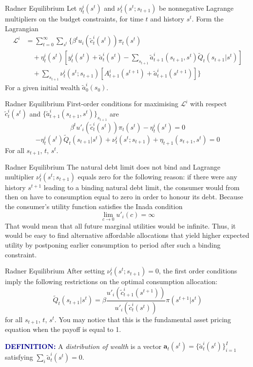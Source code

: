 \documentclass[aspectratio=169,xcolor=dvipsnames]{beamer}
\begin{document}
\begin{frame}{Radner Equilibrium}
    Let $\eta^i_t(s^t)$ and $\nu^i_t(s^t; s_{t+1})$ be nonnegative Lagrange multipliers on the budget constraints, for time $t$ and history $s^t$. Form the Lagrangian
    \begin{align*}
        \mathcal{L}^i &= \sum_{t=0}^\infty \sum_{s^t} \Bigg\{ \beta^t u_i(\tilde c^i_t(s^t)) \pi_t(s^t) \\
        &\quad + \eta^i_t(s^t)\left[ y^i_t(s^t) + \tilde a^i_t(s^t) - \sum_{s_{t+1}} \tilde a^i_{t+1}(s_{t+1}, s^t) \tilde Q_t(s_{t+1} | s^t)\right] \\
        &\quad + \sum_{s_{t+1}} \nu^i_t(s^t; s_{t+1})[A^i_{t+1}(s^{t+1}) + \tilde a^i_{t+1}(s^{t+1})]\Bigg\}
    \end{align*}
    For a given initial wealth $\tilde a^i_0(s_0)$.
\end{frame}

\begin{frame}{Radner Equilibrium}
    First-order conditions for maximising $\mathcal{L}^i$ with respect $\tilde c^i_t(s^t)$ and $\{\tilde a^i_{t+1}(s_{t+1}, s^t)\}_{s_{t+1}}$ are
    \[
        \beta^t u'_i(\tilde c^i_t(s^t)) \pi_t(s^t) - \eta^i_t(s^t) = 0
    \]
    \[
        -\eta^i_t(s^t) \tilde Q_t(s_{t+1} | s^t) + \nu^i_t(s^t; s_{t+1}) + \eta_{t+1}(s_{t+1}, s^t) = 0
    \]
    For all $s_{t+1}$, $t$, $s^t$.
\end{frame}

\begin{frame}{Radner Equilibrium}
    The natural debt limit does not bind and Lagrange multiplier $\nu^i_t(s^t; s_{t+1})$ equals zero for the following reason: if there were any history $s^{t+1}$ leading to a binding natural debt limit, the consumer would from then on have to consumption equal to zero in order to honour its debt. Because the consumer's utility function satisfies the Inada condition
    \[
        \lim_{c \to 0} u'_i(c) = \infty
    \]
    That would mean that all future marginal utilities would be infinite. Thus, it would be easy to find alternative affordable allocations that yield higher expected utility by postponing earlier consumption to period after such a binding constraint.
\end{frame}

\begin{frame}{Radner Equilibrium}
    After setting $\nu^i_t(s^t; s_{t+1}) = 0$, the first order conditions imply the following restrictions on the optimal consumption allocation:
    \[
        \tilde Q_t(s_{t+1} | s^t) = \beta \frac{u'_i(\tilde c^i_{t+1}(s^{t+1}))}{u'_i(\tilde c^i_t(s^t))} \pi(s^{t+1} | s^t)
    \]
    for all $s_{t+1}$, $t$, $s^t$. You may notice that this is the fundamental asset pricing equation when the payoff is equal to 1.

    \textcolor{darkblue}{\textbf{DEFINITION:}} A \emph{distribution of wealth} is a vector $\mathbf{a}_t(s^t) = \{\tilde a^i_t(s^t)\}_{i=1}^I$ satisfying $\sum_i \tilde a^i_t(s^t) = 0$.
\end{frame}
\end{document}

